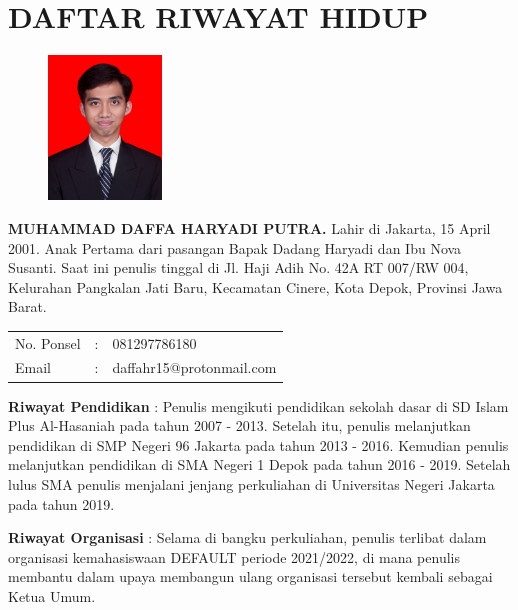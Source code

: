 \pagestyle{empty}
\chapter*{\centering \large DAFTAR RIWAYAT HIDUP}
\thispagestyle{empty}
\onehalfspacing{}

\begin{figure}
	\vspace{-25pt}
	\begin{center}
		\includegraphics[width=0.27\textwidth]{gambar/pasfoto}
	\end{center}
	\vspace{-40pt}
\end{figure}

\noindent \textbf{MUHAMMAD DAFFA HARYADI PUTRA.} Lahir di Jakarta, 15 April 2001.
Anak Pertama dari pasangan Bapak Dadang Haryadi dan Ibu Nova Susanti.
Saat ini penulis tinggal di Jl. Haji Adih No. 42A RT 007/RW 004, Kelurahan Pangkalan
Jati Baru, Kecamatan Cinere, Kota Depok, Provinsi Jawa Barat.

\vspace{1cm}
\noindent
\begin{tabular}{lcl}
	No. Ponsel	& :&  081297786180 \\
	Email	& :&  daffahr15@protonmail.com
\end{tabular}
\vspace{0.5cm}

\noindent \textbf{Riwayat Pendidikan} : Penulis mengikuti pendidikan sekolah
dasar di SD Islam Plus Al-Hasaniah pada tahun 2007 - 2013. Setelah itu,
penulis melanjutkan pendidikan di SMP Negeri 96 Jakarta pada tahun
2013 - 2016. Kemudian penulis melanjutkan pendidikan di SMA Negeri 1 Depok pada
tahun 2016 - 2019. Setelah lulus SMA penulis menjalani jenjang perkuliahan di 
Universitas Negeri Jakarta pada tahun 2019.

\noindent \textbf{Riwayat Organisasi} : Selama di bangku perkuliahan, penulis 
terlibat dalam organisasi kemahasiswaan DEFAULT periode 2021/2022, di mana penulis membantu dalam upaya 
membangun ulang organisasi tersebut kembali sebagai Ketua Umum.
